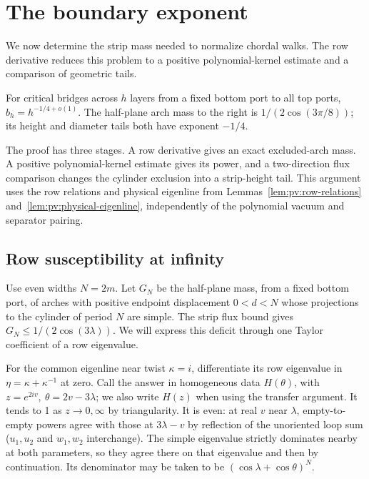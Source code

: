 \section{The boundary exponent}\label{c01-c1-the-boundary-exponent}

We now determine the strip mass needed to normalize chordal walks. The row derivative reduces this problem to a positive polynomial-kernel estimate and a comparison of geometric tails.

\begin{proposition}\label{prop:pv:boundary}
For critical bridges across $h$ layers from a fixed bottom port to all top ports, $b_h=h^{-1/4+o(1)}$. The half-plane arch mass to the right is $1/(2\cos(3\pi/8))$; its height and diameter tails both have exponent $-1/4$.
\end{proposition}

The proof has three stages. A row derivative gives an exact excluded-arch mass. A positive polynomial-kernel estimate gives its power, and a two-direction flux comparison changes the cylinder exclusion into a strip-height tail. This argument uses the row relations and physical eigenline from Lemmas~\ref{lem:pv:row-relations} and~\ref{lem:pv:physical-eigenline}, independently of the polynomial vacuum and separator pairing.

\subsection{Row susceptibility at infinity}\label{c01-c1-row-susceptibility-at-infinity}

Use even widths \(N=2m\). Let \(G_N\) be the half-plane mass, from a fixed bottom port, of arches with positive endpoint displacement \(0<d<N\) whose projections to the cylinder of period \(N\) are simple. The strip flux bound gives \(G_N\le1/(2\cos(3\lambda))\). We will express this deficit through one Taylor coefficient of a row eigenvalue.

For the common eigenline near twist \(\kappa=i\), differentiate its row eigenvalue in \(\eta=\kappa+\kappa^{-1}\) at zero. Call the answer in homogeneous data \(H(\theta)\), with \(z=e^{2iv},\ \theta=2v-3\lambda\); we also write \(H(z)\) when using the transfer argument. It tends to 1 as \(z\to0,\infty\) by triangularity. It is even: at real \(v\) near \(\lambda\), empty-to-empty powers agree with those at \(3\lambda-v\) by reflection of the unoriented loop sum (\(u_1,u_2\) and \(w_1,w_2\) interchange). The simple eigenvalue strictly dominates nearby at both parameters, so they agree there on that eigenvalue and then by continuation. Its denominator may be taken to be \((\cos\lambda+\cos\theta)^N\).

